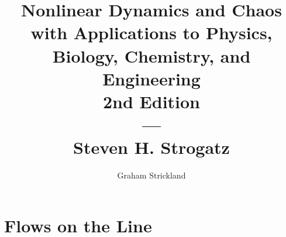 \documentclass{article}
\title{
    Nonlinear Dynamics and Chaos with Applications to Physics, Biology, Chemistry,
    and Engineering\\2nd Edition\\---\\Steven H. Strogatz
}
\author{Graham Strickland}
\begin{document}
\maketitle  

\setcounter{section}{1}
\section{Flows on the Line}

\end{document}
